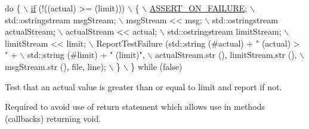 \begin{DoxyCode}
\textcolor{keywordflow}{do} \{                                                                  \hyperlink{loss__ITU1238_8m_a419d895abe1313c35fa353c93802647e}{\(\backslash\)}
\hyperlink{loss__ITU1238_8m_a419d895abe1313c35fa353c93802647e}{    if} (!((actual) >= (limit)))                                         \(\backslash\)
      \{                                                                 \hyperlink{group__testing_ga044d7c8c214fe3761af96ee3cbe2edc3}{\(\backslash\)}
\hyperlink{group__testing_ga044d7c8c214fe3761af96ee3cbe2edc3}{        ASSERT\_ON\_FAILURE};                                              \(\backslash\)
        std::ostringstream msgStream;                                   \(\backslash\)
        msgStream << msg;                                               \(\backslash\)
        std::ostringstream actualStream;                                \(\backslash\)
        actualStream << actual;                                         \(\backslash\)
        std::ostringstream limitStream;                                 \(\backslash\)
        limitStream << limit;                                           \(\backslash\)
        ReportTestFailure (std::string (#actual) + \textcolor{stringliteral}{" (actual) > "} +     \(\backslash\)
                       std::string (#limit) + \textcolor{stringliteral}{" (limit)"},               \(\backslash\)
                       actualStream.str (), limitStream.str (),         \(\backslash\)
                       msgStream.str (), file, line);                   \(\backslash\)
      \}                                                                 \(\backslash\)
  \} \textcolor{keywordflow}{while} (\textcolor{keyword}{false})
\end{DoxyCode}


Test that an actual value is greater than or equal to limit and report if not. 

Required to avoid use of return statement which allows use in methods (callbacks) returning void. 
